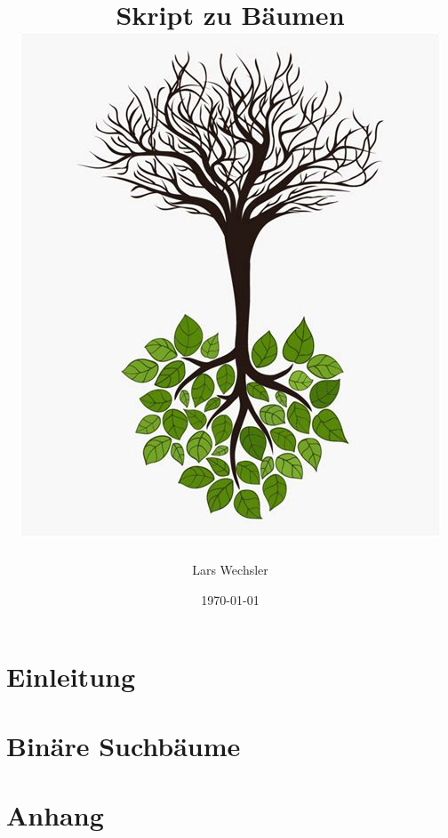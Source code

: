 \documentclass{article}
\author{Lars Wechsler}
\title{Skript zu Bäumen \\ \centering\includegraphics[scale=0.80]{media/tree.jpg}}
\date{\today}
\begin{document}
\maketitle
\newpage
\tableofcontents
\newpage 

\section{Einleitung}



\newpage
\section{Binäre Suchbäume}




%

\newpage
\section{Anhang}


\end{document}
